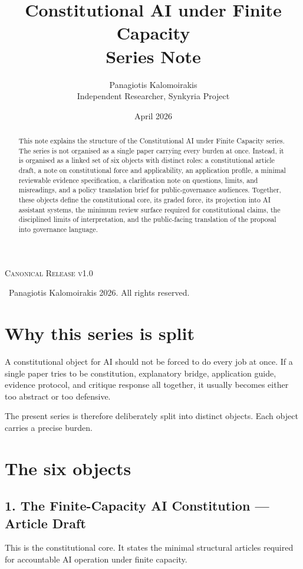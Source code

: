 \documentclass[11pt]{article}
\title{Constitutional AI under Finite Capacity\\
Series Note}
\author{Panagiotis Kalomoirakis\\
Independent Researcher, Synkyria Project}
\date{April 2026}
\begin{document}
\maketitle

\begin{center}
\small\textsc{Canonical Release v1.0}

\small \textcopyright\ Panagiotis Kalomoirakis 2026. All rights reserved.

\end{center}

\begin{abstract}
This note explains the structure of the Constitutional AI under Finite Capacity series. The series is not organised as a single paper carrying every burden at once. Instead, it is organised as a linked set of six objects with distinct roles: a constitutional article draft, a note on constitutional force and applicability, an application profile, a minimal reviewable evidence specification, a clarification note on questions, limits, and misreadings, and a policy translation brief for public-governance audiences. Together, these objects define the constitutional core, its graded force, its projection into AI assistant systems, the minimum review surface required for constitutional claims, the disciplined limits of interpretation, and the public-facing translation of the proposal into governance language.
\end{abstract}

\section{Why this series is split}

A constitutional object for AI should not be forced to do every job at once. If a single paper tries to be constitution, explanatory bridge, application guide, evidence protocol, and critique response all together, it usually becomes either too abstract or too defensive.

The present series is therefore deliberately split into distinct objects. Each object carries a precise burden.

\section{The six objects}

\subsection*{1. The Finite-Capacity AI Constitution --- Article Draft}
This is the constitutional core. It states the minimal structural articles required for accountable AI operation under finite capacity.
\end{document}
